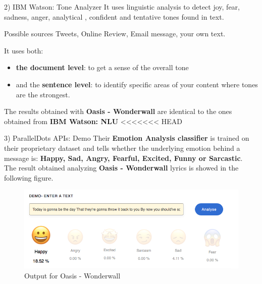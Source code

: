 \documentclass[xcolor=dvipsnames]{beamer}
\begin{document}
\begin{frame}{2) IBM Watson: Tone Analyzer}
It uses linguistic analysis to detect joy, fear, sadness, anger, analytical , confident and tentative tones found in text. \cite{p3}
\begin{block}{Possible sources}
Tweets, Online Review, Email message, your own text.
\end{block}
It uses both:
\begin{itemize}
\item \textbf{the document level}: to get a sense of the overall tone 
\item and the \textbf{sentence level}: to identify specific areas of your content where tones are the strongest.
\end{itemize}
The results obtained with \textbf{Oasis - Wonderwall} are identical to the ones obtained from \textbf{IBM Watson: NLU}
<<<<<<< HEAD

\end{frame}

\begin{frame}{3) ParallelDots APIs: Demo}
Their \textbf{Emotion Analysis classifier} is trained on their proprietary dataset and tells whether the underlying emotion behind a message is: \textbf{Happy, Sad, Angry, Fearful, Excited, Funny or Sarcastic}.\cite{p4}
\\The result obtained analyzing \textbf{Oasis - Wonderwall} lyrics is showed in the following figure. 
\begin{figure}
	\includegraphics[scale=0.3]{./images/pd_wonderwall}
	\caption{Output for Oasis - Wonderwall}
\end{figure}
\end{frame}
\end{document}
